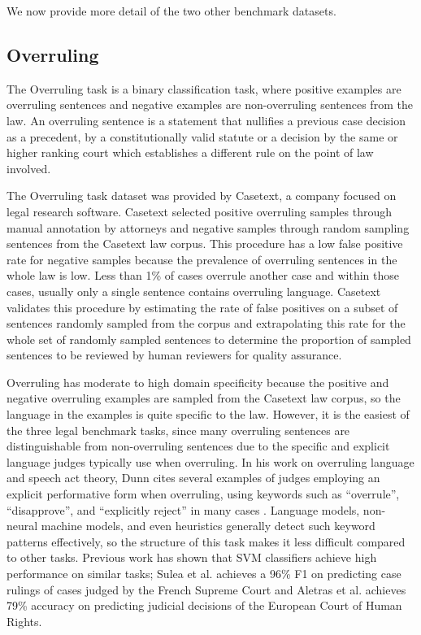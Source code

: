 \documentclass[sigconf]{acmart}
\begin{document}
We now provide more detail of the two other benchmark datasets. 

\subsection{Overruling}
\label{sec:overruling}
The Overruling task is a binary classification task, where positive examples are overruling sentences and negative examples are non-overruling sentences from the law. An overruling sentence is a statement that nullifies a previous case decision as a precedent, by a constitutionally valid statute or a decision by the same or higher ranking court which establishes a different rule on the point of law involved.

The Overruling task dataset was provided by Casetext, a company focused on legal research software. Casetext selected positive overruling samples through manual annotation by attorneys and negative samples through random sampling sentences from the Casetext law corpus. This procedure has a low false positive rate for negative samples because the prevalence of overruling sentences in the whole law is low. Less than 1\% of cases overrule another case and within those cases, usually only a single sentence contains overruling language. Casetext validates this procedure by estimating the rate of false positives on a subset of sentences randomly sampled from the corpus and extrapolating this rate for the whole set of randomly sampled sentences to determine the proportion of sampled sentences to be reviewed by human reviewers for quality assurance.

Overruling has moderate to high domain specificity because the positive and negative overruling examples are sampled from the Casetext law corpus, so the language in the examples is quite specific to the law. However, it is the easiest of the three legal benchmark tasks, since many overruling sentences are distinguishable from non-overruling sentences due to the specific and explicit language judges typically use when overruling. In his work on overruling language and speech act theory, Dunn cites several examples of judges employing an explicit performative form when overruling, using keywords such as ``overrule'', ``disapprove'', and ``explicitly reject'' in many cases \cite{dunn2003judges}. Language models, non-neural machine models, and even heuristics generally detect such keyword patterns effectively, so the structure of this task makes it less difficult compared to other tasks. Previous work has shown that SVM classifiers achieve high performance on similar tasks; Sulea et al. \cite{sulea:2017:legal} achieves a 96\% F1 on predicting case rulings of cases judged by the French Supreme Court and Aletras et al. \cite{aletras2016predicting} achieves 79\% accuracy on predicting judicial decisions of the European Court of Human Rights.
\end{document}
